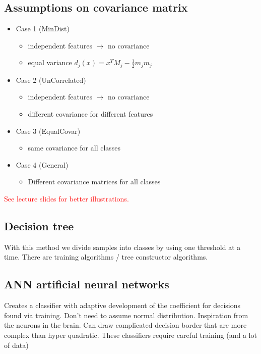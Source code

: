 \subsection*{Assumptions on covariance matrix}
\begin{itemize}
	\item Case 1 (MinDist)
	\begin{itemize}
		\item independent features $\rightarrow$ no covariance
		\item equal variance
		$d_j(x) = x^{T}M_j -\frac{1} {2} m_jm_j$
	\end{itemize}
	\item Case 2 (UnCorrelated)
	\begin{itemize}
		\item independent features $\rightarrow$ no covariance
		\item different covariance for different features
	\end{itemize}
	\item Case 3 (EqualCovar)
	\begin{itemize}
		\item same covariance for all classes
	\end{itemize}
	\item Case 4 (General)
	\begin{itemize}
		\item Different covariance matrices for all classes
	\end{itemize}
\end{itemize}

\textcolor{red}{See lecture slides for better illustrations.} 


\subsection*{Decision tree}
With this method we divide samples into classes by using one threshold at a time. There are training algorithms / tree constructor algorithms.




\subsection*{ANN artificial neural networks}
Creates a classifier with adaptive development of the coefficient for decisions found via training. Don't need to assume normal distribution. Inspiration from the neurons in the brain. Can draw complicated decision border that are more complex than hyper quadratic. These classifiers require careful training (and a lot of data)




